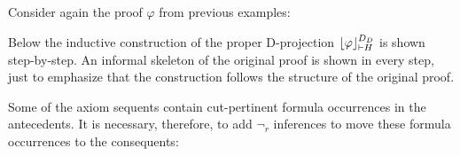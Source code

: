 \documentclass{llncs}
\begin{document}
\begin{example}
\label{example:DProjectionProper}


Consider again the proof $\varphi$ from previous examples:

\begin{prooftree}
		 
	 
						 
					 
					 
									 
								 
\end{prooftree}

Below the inductive construction of the proper D-projection $\projectionDDefinitional{\varphi}{ \seq H}$ is shown step-by-step. An informal skeleton of the original proof is shown in every step, just to emphasize that the construction follows the structure of the original proof.

\begin{prooftree}
		 
	 
						 
					 
					 
									 
								 
\end{prooftree}

Some of the axiom sequents contain cut-pertinent formula occurrences in the antecedents. It is necessary, therefore, to add $\neg_r$ inferences to move these formula occurrences to the consequents:


\end{example}
\end{document}
